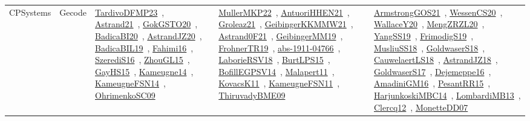 {\begin{longtable}{lp{3cm}>{\raggedright\arraybackslash}p{6cm}>{\raggedright\arraybackslash}p{6cm}>{\raggedright\arraybackslash}p{8cm}}
CPSystems & Gecode & \href{../works/TardivoDFMP23.pdf}{TardivoDFMP23}~\cite{TardivoDFMP23}, \href{../works/Astrand21.pdf}{Astrand21}~\cite{Astrand21}, \href{../works/GokGSTO20.pdf}{GokGSTO20}~\cite{GokGSTO20}, \href{../works/BadicaBI20.pdf}{BadicaBI20}~\cite{BadicaBI20}, \href{../works/AstrandJZ20.pdf}{AstrandJZ20}~\cite{AstrandJZ20}, \href{../works/BadicaBIL19.pdf}{BadicaBIL19}~\cite{BadicaBIL19}, \href{../works/Fahimi16.pdf}{Fahimi16}~\cite{Fahimi16}, \href{../works/SzerediS16.pdf}{SzerediS16}~\cite{SzerediS16}, \href{../works/ZhouGL15.pdf}{ZhouGL15}~\cite{ZhouGL15}, \href{../works/GayHS15.pdf}{GayHS15}~\cite{GayHS15}, \href{../works/Kameugne14.pdf}{Kameugne14}~\cite{Kameugne14}, \href{../works/KameugneFSN14.pdf}{KameugneFSN14}~\cite{KameugneFSN14}, \href{../works/OhrimenkoSC09.pdf}{OhrimenkoSC09}~\cite{OhrimenkoSC09} & \href{../works/MullerMKP22.pdf}{MullerMKP22}~\cite{MullerMKP22}, \href{../works/AntuoriHHEN21.pdf}{AntuoriHHEN21}~\cite{AntuoriHHEN21}, \href{../works/Groleaz21.pdf}{Groleaz21}~\cite{Groleaz21}, \href{../works/GeibingerKKMMW21.pdf}{GeibingerKKMMW21}~\cite{GeibingerKKMMW21}, \href{../works/Astrand0F21.pdf}{Astrand0F21}~\cite{Astrand0F21}, \href{../works/GeibingerMM19.pdf}{GeibingerMM19}~\cite{GeibingerMM19}, \href{../works/FrohnerTR19.pdf}{FrohnerTR19}~\cite{FrohnerTR19}, \href{../works/abs-1911-04766.pdf}{abs-1911-04766}~\cite{abs-1911-04766}, \href{../works/LaborieRSV18.pdf}{LaborieRSV18}~\cite{LaborieRSV18}, \href{../works/BurtLPS15.pdf}{BurtLPS15}~\cite{BurtLPS15}, \href{../works/BofillEGPSV14.pdf}{BofillEGPSV14}~\cite{BofillEGPSV14}, \href{../works/Malapert11.pdf}{Malapert11}~\cite{Malapert11}, \href{../works/KovacsK11.pdf}{KovacsK11}~\cite{KovacsK11}, \href{../works/KameugneFSN11.pdf}{KameugneFSN11}~\cite{KameugneFSN11}, \href{../works/ThiruvadyBME09.pdf}{ThiruvadyBME09}~\cite{ThiruvadyBME09} & \href{../works/ArmstrongGOS21.pdf}{ArmstrongGOS21}~\cite{ArmstrongGOS21}, \href{../works/WessenCS20.pdf}{WessenCS20}~\cite{WessenCS20}, \href{../works/WallaceY20.pdf}{WallaceY20}~\cite{WallaceY20}, \href{../works/MengZRZL20.pdf}{MengZRZL20}~\cite{MengZRZL20}, \href{../works/YangSS19.pdf}{YangSS19}~\cite{YangSS19}, \href{../works/FrimodigS19.pdf}{FrimodigS19}~\cite{FrimodigS19}, \href{../works/MusliuSS18.pdf}{MusliuSS18}~\cite{MusliuSS18}, \href{../works/GoldwaserS18.pdf}{GoldwaserS18}~\cite{GoldwaserS18}, \href{../works/CauwelaertLS18.pdf}{CauwelaertLS18}~\cite{CauwelaertLS18}, \href{../works/AstrandJZ18.pdf}{AstrandJZ18}~\cite{AstrandJZ18}, \href{../works/GoldwaserS17.pdf}{GoldwaserS17}~\cite{GoldwaserS17}, \href{../works/Dejemeppe16.pdf}{Dejemeppe16}~\cite{Dejemeppe16}, \href{../works/AmadiniGM16.pdf}{AmadiniGM16}~\cite{AmadiniGM16}, \href{../works/PesantRR15.pdf}{PesantRR15}~\cite{PesantRR15}, \href{../works/HarjunkoskiMBC14.pdf}{HarjunkoskiMBC14}~\cite{HarjunkoskiMBC14}, \href{../works/LombardiMB13.pdf}{LombardiMB13}~\cite{LombardiMB13}, \href{../works/Clercq12.pdf}{Clercq12}~\cite{Clercq12}, \href{../works/MonetteDD07.pdf}{MonetteDD07}~\cite{MonetteDD07}\\

\end{longtable}}
